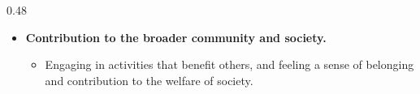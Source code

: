 \documentclass[
	aspectratio=169, %
	t, %
	onlytextwidth, %
	10pt, %
]{beamer}
\begin{document}
\begin{frame}
\begin{columns}[T]
\begin{column}{0.48\linewidth}
\begin{itemize}
\begin{itemize}
                        \item \textbf{Contribution to the broader community and society.}
                        \begin{itemize}
                            \item Engaging in activities that benefit others, and feeling a sense of belonging and contribution to the welfare of society.
                        \end{itemize}
				\end{itemize}
			\end{itemize}
		\end{column}
	\end{columns}
\end{frame}

\end{document}
